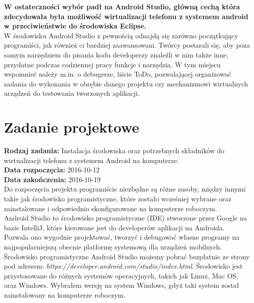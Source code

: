 \textbf{W ostateczności wybór padł na Android Studio, główną cechą która zdecydowała była możliwość wirtualizacji telefonu z systemem android w przeciwieństwie do środowiska Eclipse.}
\\

W środowisku Android Studio z pewnością odnajdą się zarówno początkujący programiści, jak również ci bardziej zaawansowani. Twórcy postarali się, aby poza samym narzędziem do pisania kodu developerzy znaleźli w nim także inne, przydatne podczas codziennej pracy funkcje i narzędzia. W tym miejscu wspomnieć należy m.in. o debugerze, liście ToDo, pozwalającej organizować zadania do wykonania w obrębie danego projektu czy mechanizmowi wirtualnych urządzeń do testowania tworzonych aplikacji.




\section{Zadanie projektowe}
\noindent\textbf{Rodzaj zadania:} Instalacja środowiska oraz potrzebnych składników do wirtualizacji telefonu z systemem Android na komputerze. \\

\noindent\textbf{Data rozpoczęcia:} 2016-10-12\\

\noindent\textbf{Data zakończenia:} 2016-10-19\\


Do rozpoczęcia projektu programiście niezbędne są różne zasoby, między innymi takie jak środowisko programistyczne, które zostało wcześniej wybrane oraz zainstalowane i odpowiednio skonfigurowane na komputerze roboczym.
\\

Android Studio to środowisko programistyczne (IDE) stworzone przez Google na bazie IntelliJ, które kierowane jest do developerów aplikacji na Androida. Pozwala ono wygodnie projektować, tworzyć i debugować własne programy na najpopularniejszą obecnie platformę systemową dla urządzeń mobilnych.
\\

Środowisko programistyczne Android Studio możemy pobrać bezpłatnie ze strony pod adresem: \textit{https://developer.android.com/studio/index.html}. Środowisko jest przystosowane do różnych systemów operacyjnych, takich jak Linux, Mac OS, oraz Windows. Wybrałem wersję na system Windows, gdyż taki system został zainstalowany na komputerze roboczym.
\\


